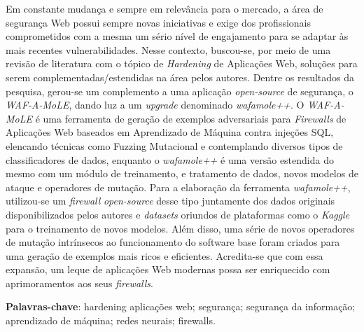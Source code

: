 \begin{resumo}
\begin{SingleSpace}
Em constante mudança e sempre em relevância para o mercado, a área de segurança Web possui sempre novas iniciativas e exige dos profissionais comprometidos com a mesma um sério nível de engajamento para se adaptar às mais recentes vulnerabilidades. Nesse contexto, buscou-se, por meio de uma revisão de literatura com o tópico de \textit{Hardening} de Aplicações Web, soluções para serem complementadas/estendidas na área pelos autores.
Dentre os resultados da pesquisa, gerou-se um complemento a uma aplicação \textit{open-source} de segurança, o \textit{WAF-A-MoLE}, dando luz a um \textit{upgrade} denominado \textit{wafamole++}. O \textit{WAF-A-MoLE} é uma ferramenta de geração de exemplos adversariais para \textit{Firewalls} de Aplicações Web baseados em Aprendizado de Máquina contra injeções SQL, elencando técnicas como Fuzzing Mutacional e contemplando diversos tipos de classificadores de dados, enquanto o \textit{wafamole++} é uma versão estendida do mesmo com um módulo de treinamento, e tratamento de dados, novos modelos de ataque e operadores de mutação. Para a elaboração da ferramenta \textit{wafamole++}, utilizou-se um \textit{firewall }\textit{open-source} desse tipo juntamente dos dados originais disponibilizados pelos autores e \textit{datasets} oriundos de plataformas como o \textit{Kaggle} para o treinamento de novos modelos. Além disso, uma série de novos operadores de mutação intrínsecos ao funcionamento do software base foram criados para uma geração de exemplos mais ricos e eficientes. Acredita-se que com essa expansão, um leque de aplicações Web modernas possa ser enriquecido com aprimoramentos aos seus \textit{firewalls}.
\end{SingleSpace}
\vspace{\onelineskip}
\textbf{Palavras-chave}: hardening aplicações web; segurança; segurança da informação; aprendizado de máquina; redes neurais; firewalls.

\end{resumo}



